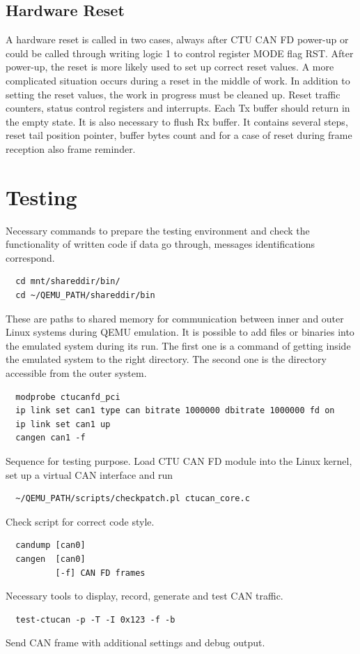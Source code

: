 \documentclass{ctuthesis}
\begin{document}
 \section{Hardware Reset}
  A hardware reset is called in two cases, always after CTU CAN FD power-up or could be called through writing logic 1 to control register MODE flag RST. After power-up, the reset is more likely used to set up correct reset values. A more complicated situation occurs during a reset in the middle of work. In addition to setting the reset values, the work in progress must be cleaned up. Reset traffic counters, status control registers and interrupts. Each Tx buffer should return in the empty state. It is also necessary to flush Rx buffer. It contains several steps, reset tail position pointer, buffer bytes count and for a case of reset during frame reception also frame reminder.
 
\chapter{Testing}
 Necessary commands to prepare the testing environment and check the functionality of written code if data go through, messages identifications correspond.
 \begin{verbatim}  cd mnt/shareddir/bin/
  cd ~/QEMU_PATH/shareddir/bin\end{verbatim}
 These are paths to shared memory for communication between inner and outer Linux systems during QEMU emulation. It is possible to add files or binaries into the emulated system during its run. The first one is a command of getting inside the emulated system to the right directory. The second one is the directory accessible from the outer system.
 \begin{verbatim}  modprobe ctucanfd_pci
  ip link set can1 type can bitrate 1000000 dbitrate 1000000 fd on
  ip link set can1 up
  cangen can1 -f\end{verbatim}
 Sequence for testing purpose. Load CTU CAN FD module into the Linux kernel, set up a virtual CAN interface and run
 \begin{verbatim}  ~/QEMU_PATH/scripts/checkpatch.pl ctucan_core.c\end{verbatim}
 Check script for correct code style.
 \begin{verbatim}  candump [can0]
  cangen  [can0]
          [-f] CAN FD frames\end{verbatim}
 Necessary tools to display, record, generate and test CAN traffic. \cite{can-utils}
 \begin{verbatim}  test-ctucan -p -T -I 0x123 -f -b\end{verbatim}
 Send CAN frame with additional settings and debug output.
\end{document}
